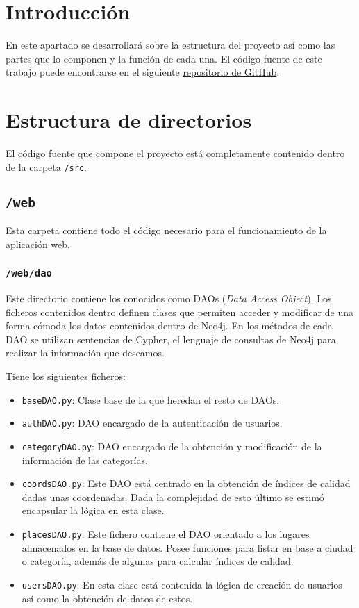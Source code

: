 
\section{Introducción}
En este apartado se desarrollará sobre la estructura del proyecto así como las partes que lo componen y la función de cada una. El código fuente de este trabajo puede encontrarse en el siguiente \href{https://github.com/mariohu2001/TFG-Urban-Street-Mapping-Transfer}{repositorio de GitHub}.
\section{Estructura de directorios}

El código fuente que compone el proyecto está completamente contenido dentro de la carpeta \texttt{/src}.

\subsection{\texttt{/web}}
Esta carpeta contiene todo el código necesario para el funcionamiento de la aplicación web.

\subsubsection{\texttt{/web/dao}}
Este directorio contiene los conocidos como DAOs (\textit{Data Access Object}). Los ficheros contenidos dentro definen clases que permiten acceder y modificar de una forma cómoda los datos contenidos dentro de Neo4j. En los métodos de cada DAO se utilizan sentencias de Cypher, el lenguaje de consultas de Neo4j para realizar la información que deseamos.

Tiene los siguientes ficheros:
\begin{itemize}
	\item \texttt{baseDAO.py}: Clase base de la que heredan el resto de DAOs.
	\item \texttt{authDAO.py}: DAO encargado de la autenticación de usuarios.
	\item \texttt{categoryDAO.py}: DAO encargado de la obtención y modificación de la información de las categorías.
	\item \texttt{coordsDAO.py}: Este DAO está centrado en la obtención de índices de calidad dadas unas coordenadas. Dada la complejidad de esto último se estimó encapsular la lógica en esta clase.
	\item \texttt{placesDAO.py}: Este fichero contiene el DAO orientado a los lugares almacenados en la base de datos. Posee funciones para listar en base a ciudad o categoría, además de algunas para calcular índices de calidad.
	\item \texttt{usersDAO.py}: En esta clase está contenida la lógica de creación de usuarios así como la obtención de datos de estos.
\end{itemize}

